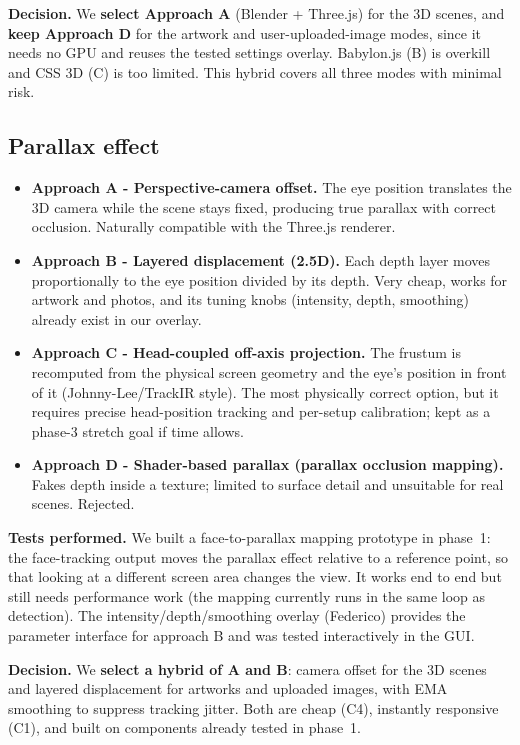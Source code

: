 \documentclass[11pt,a4paper]{article}
\begin{document}
\noindent\textbf{Decision.} We \textbf{select Approach A} (Blender + Three.js)
for the 3D scenes, and \textbf{keep Approach D} for the artwork and
user-uploaded-image modes, since it needs no GPU and reuses the tested
settings overlay. Babylon.js (B) is overkill and CSS 3D (C) is too limited.
This hybrid covers all three modes with minimal risk.

\subsection{Parallax effect}

\begin{itemize}[leftmargin=*,itemsep=1pt,topsep=2pt]
\item \textbf{Approach A - Perspective-camera offset.} The eye position
translates the 3D camera while the scene stays fixed, producing true parallax
with correct occlusion. Naturally compatible with the Three.js renderer.
\item \textbf{Approach B - Layered displacement (2.5D).} Each depth layer
moves proportionally to the eye position divided by its depth. Very cheap,
works for artwork and photos, and its tuning knobs (intensity, depth,
smoothing) already exist in our overlay.
\item \textbf{Approach C - Head-coupled off-axis projection.} The frustum is
recomputed from the physical screen geometry and the eye's position in front
of it (Johnny-Lee/TrackIR style). The most physically correct option, but it
requires precise head-position tracking and per-setup calibration; kept as a
phase-3 stretch goal if time allows.
\item \textbf{Approach D - Shader-based parallax (parallax occlusion
mapping).} Fakes depth inside a texture; limited to surface detail and
unsuitable for real scenes. Rejected.
\end{itemize}

\noindent\textbf{Tests performed.} We built a face-to-parallax
mapping prototype in phase~1: the face-tracking output moves the parallax
effect relative to a reference point, so that looking at a different screen
area changes the view. It works end to end but still needs performance work
(the mapping currently runs in the same loop as detection). The
intensity/depth/smoothing overlay (Federico) provides the parameter interface
for approach B and was tested interactively in the GUI.

\noindent\textbf{Decision.} We \textbf{select a hybrid of A and B}: camera
offset for the 3D scenes and layered displacement for artworks and uploaded
images, with EMA smoothing to suppress tracking jitter. Both are cheap
(C4), instantly responsive (C1), and built on components already tested in
phase~1.
\end{document}
